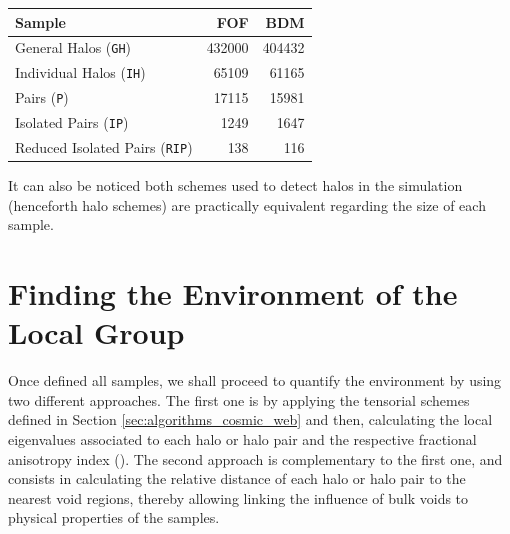 \documentclass[usenatbib]{latex/mn2e}
\begin{document}
\begin{table}[h]
\begin{flushleft}
\begin{center}
  \begin{tabular}{l  r  r} \hline\hline
	\textbf{Sample}					&\textbf{FOF}&\textbf{BDM} \\ \hline
	General Halos (\texttt{GH}) 	& 432000	 & 404432  \\ 
	Individual Halos (\texttt{IH}) 	& 65109		 & 61165  \\ 
	Pairs (\texttt{P}) 	 			& 17115		 & 15981  \\ 
	Isolated Pairs (\texttt{IP})	& 1249		 & 1647  \\ 
	Reduced Isolated Pairs (\texttt{RIP})& 138	 & 116  \\ \hline\hline
  \end{tabular}  
  
  \label{tab:Samples_Size}
  
\end{center}
\end{flushleft}
\end{table}


It can also be noticed both schemes used to detect halos in the simulation 
(henceforth halo schemes) are practically equivalent regarding the size of 
each sample.


\section{Finding the Environment of the Local Group}
\label{sec:LGEnvironment}



Once defined all samples, we shall proceed to quantify the environment
by using two different approaches. The first one is by applying the 
tensorial schemes defined in Section \ref{sec:algorithms_cosmic_web} 
and then, calculating the local eigenvalues associated to each halo or halo 
pair and the respective fractional anisotropy index (). The second approach is complementary to the first one, and 
consists in calculating the relative distance of each halo or halo pair to 
the nearest void regions, thereby allowing linking the influence of bulk 
voids to physical properties of the samples.
\end{document}
